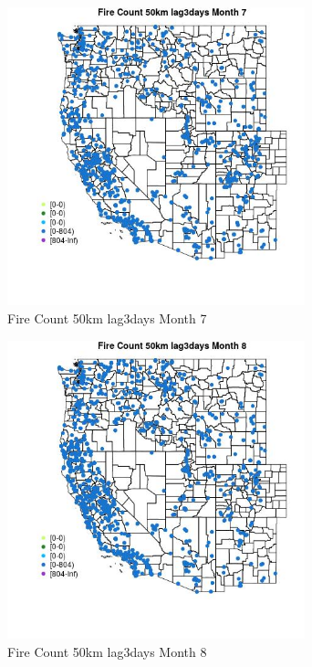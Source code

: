 \begin{figure} 
\centering  
\includegraphics[width=0.77\textwidth]{Code_Outputs/Report_ML_input_PM25_Step4_part_f_de_duplicated_aveswNAs_MapObsMo7Fire_Count_50km_lag3days.jpg} 
\caption{\label{fig:Report_ML_input_PM25_Step4_part_f_de_duplicated_aveswNAsMapObsMo7Fire_Count_50km_lag3days}Fire Count 50km lag3days Month 7} 
\end{figure} 
 

\begin{figure} 
\centering  
\includegraphics[width=0.77\textwidth]{Code_Outputs/Report_ML_input_PM25_Step4_part_f_de_duplicated_aveswNAs_MapObsMo8Fire_Count_50km_lag3days.jpg} 
\caption{\label{fig:Report_ML_input_PM25_Step4_part_f_de_duplicated_aveswNAsMapObsMo8Fire_Count_50km_lag3days}Fire Count 50km lag3days Month 8} 
\end{figure} 
 

